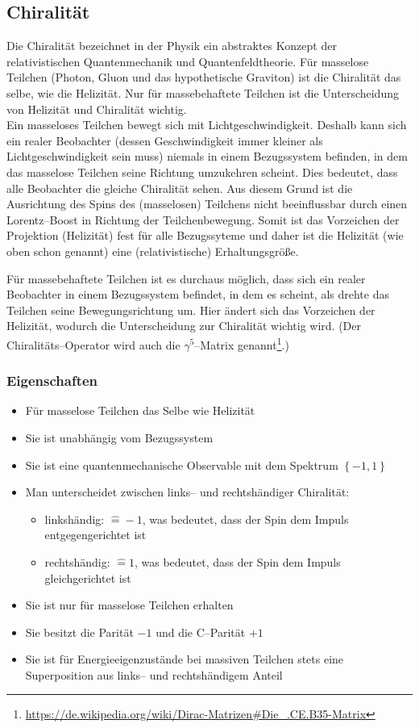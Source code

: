 \documentclass[Ex4_Zusammenfassung.tex]{subfiles}
\begin{document}
\subsection{Chiralität}
Die Chiralität bezeichnet in der Physik ein abstraktes Konzept der relativistischen Quantenmechanik und Quantenfeldtheorie. Für masselose Teilchen (Photon, Gluon und das hypothetische Graviton) ist die Chiralität das selbe, wie die Helizität. Nur für massebehaftete Teilchen ist die Unterscheidung von Helizität und Chiralität wichtig.\\

Ein masseloses Teilchen bewegt sich mit Lichtgeschwindigkeit. Deshalb kann sich ein realer Beobachter (dessen Geschwindigkeit immer kleiner als Lichtgeschwindigkeit sein muss) niemals in einem Bezugssystem befinden, in dem das masselose Teilchen seine Richtung umzukehren scheint. Dies bedeutet, dass alle Beobachter die gleiche Chiralität sehen. Aus diesem Grund ist die Ausrichtung des Spins des (masselosen) Teilchens nicht beeinflussbar durch einen Lorentz--Boost in Richtung der Teilchenbewegung. Somit ist das Vorzeichen der Projektion (Helizität) fest für alle Bezugssyteme und daher ist die Helizität (wie oben schon genannt) eine (relativistische) Erhaltungsgröße. 

Für massebehaftete Teilchen ist es durchaus möglich, dass sich ein realer Beobachter in einem Bezugssystem befindet, in dem es scheint, als drehte das Teilchen seine Bewegungsrichtung um. Hier ändert sich das Vorzeichen der Helizität, wodurch die Unterscheidung zur Chiralität wichtig wird. (Der Chiralitäts--Operator wird auch die $\gamma^5$--Matrix genannt\footnote{\href{https://de.wikipedia.org/wiki/Dirac-Matrizen\#Die\_.CE.B35-Matrix}{https://de.wikipedia.org/wiki/Dirac-Matrizen\#Die\_.CE.B35-Matrix}}.)

\subsubsection{Eigenschaften}
\begin{itemize}
	\item Für masselose Teilchen das Selbe wie Helizität
	\item Sie ist unabhängig vom Bezugssystem
	\item Sie ist eine quantenmechanische Observable mit dem Spektrum $\left\{ -1, 1\right\}$
	\item Man unterscheidet zwischen links-- und rechtshändiger Chiralität: 
		\begin{itemize}
			\item linkshändig: $\hat{=} -1$, was bedeutet, dass der Spin dem Impuls entgegengerichtet ist
			\item rechtshändig: $\hat{=} 1$, was bedeutet, dass der Spin dem Impuls gleichgerichtet ist
		\end{itemize}
	\item Sie ist nur für masselose Teilchen erhalten
	\item Sie besitzt die Parität $-1$ und die C--Parität $+1$
	\item Sie ist für Energieeigenzustände bei massiven Teilchen stets eine Superposition aus links-- und rechtshändigem Anteil
\end{itemize}
\end{document}
